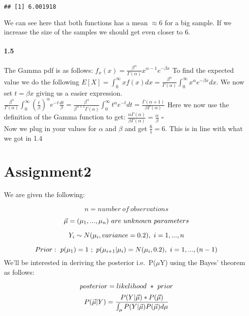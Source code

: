 \documentclass[
]{article}
\begin{document}
\begin{verbatim}
## [1] 6.001918
\end{verbatim}

We can see here that both functions has a mean \(\approx 6\) for a big
sample. If we increase the size of the samples we should get even closer
to 6.

\hypertarget{section-2}{%
\paragraph{1.5}\label{section-2}}

The Gamma pdf is as follows:
\(f_x(x)=\frac{\beta^{\alpha}}{\Gamma(\alpha)}x^{\alpha -1 }e^{-\beta x}\)
To find the expected value we do the following
\(E[X]=\int_{0}^{\infty}xf(x)dx= \frac{\beta^{\alpha}}{\Gamma(\alpha)}\int_{0}^{\infty}x^{{\alpha}}e^{-\beta x}dx\).
We now set \(t= \beta x\) giving us a easier expression.
\(\frac{\beta^{\alpha}}{\Gamma(\alpha)} \int_{0}^{\infty} \left( \frac{t}{\beta}\right)^{\alpha}e^{-t}\frac{dt}{\beta}=\frac{\beta^{\alpha}}{\beta^{\alpha+1}\Gamma(\alpha)}\int_{0}^{\infty}t^{\alpha}e^{-t}dt = \frac{\Gamma(\alpha +1)}{\beta \Gamma(\alpha)}\)
Here we now use the definition of the Gamma function to get:
\(\frac{\alpha\Gamma(\alpha)}{\beta \Gamma(\alpha)} = \frac{\alpha}{\beta}\)
\(\square\)\\
Now we plug in your values for \(\alpha\) and \(\beta\) and get
\(\frac{6}{1}=6\). This is in line with what we got in 1.4

\hypertarget{assignment2}{%
\section{Assignment2}\label{assignment2}}

We are given the following:

\[
n = number\  of\  observations
\]

\[
\vec{\mu} = (\mu_1, ...,\mu_n) \ are \ unknown \ parameters \\
\]

\[
Y_i \sim N(\mu_i, variance=0.2), \ i=1,...,n \\
\]

\[
Prior: \ p(\mu_1) = 1 \ ; \ p(\mu_{i+1}|\mu_i) = N(\mu_i, 0.2), \ i=1,...,(n-1) \\
\] We'll be interested in deriving the posterior
i.e.~P(\(\mu\)\textbar Y) using the Bayes' theorem as follows:

\[
posterior = likelihood \ * \ prior \\
\] \[
P(\vec{\mu}|Y) = \frac{P(Y|\vec{\mu}) * P(\vec{\mu})}{\int_{\mu}P(Y|\vec{\mu})P(\vec{\mu})d\mu} \\
\]
\end{document}
